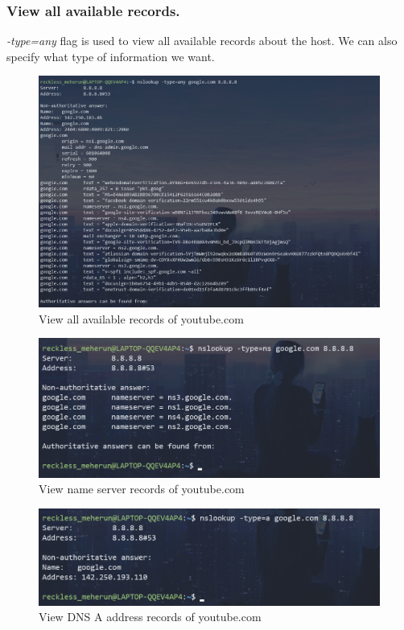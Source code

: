 \documentclass[11pt]{article}
\begin{document}
\subsubsection*{View all available records.}
\emph{-type=any} flag is used to view all available records about the host. We can also specify what type of information we want.
\begin{figure}[H]
\centering
\includegraphics[width=\textwidth]{res/nslookup 3.png}
\caption{View all available records of youtube.com}
\end{figure}
\begin{figure}[H]
\centering
\includegraphics[width=\textwidth]{res/nslookup 4.png}
\caption{View name server records of youtube.com}
\end{figure}
\begin{figure}[H]
\centering
\includegraphics[width=\textwidth]{res/nslookup 5.png}
\caption{View DNS A address records of youtube.com}
\end{figure}
\end{document}
